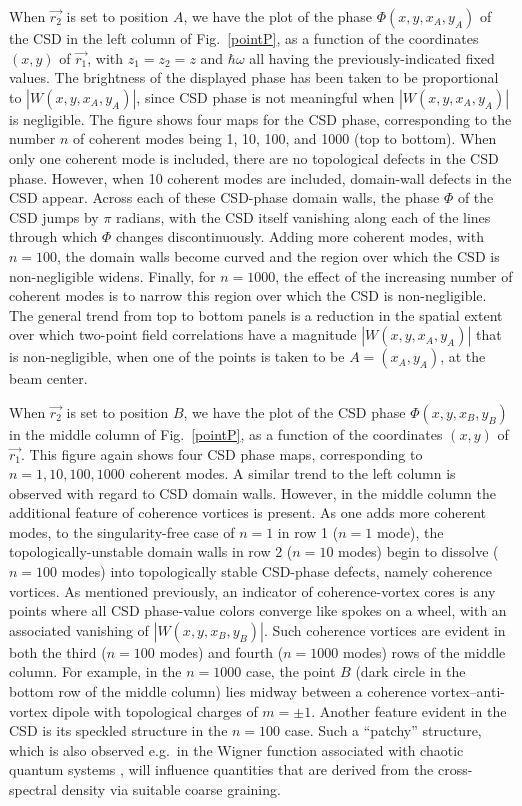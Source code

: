 \documentclass[%
 reprint,
 amsmath,amssymb,
 aps,
]{revtex4-1}
\begin{document}
When $\vec{r_2}$ is set to position $A$, we have the plot of the phase $\Phi(x,y,x_A,y_A)$ of the CSD in the left column of Fig.~\ref{pointP}, as a function of the coordinates $(x,y)$ of $\vec{r_1}$, with $z_1=z_2=z$ and $\hbar\omega$ all having the previously-indicated fixed values.  The brightness of the displayed phase has been taken to be proportional to $|W(x,y,x_A,y_A)|$, since CSD phase is not meaningful when $|W(x,y,x_A,y_A)|$ is negligible.  The figure shows four maps for the CSD phase, corresponding to the number $n$ of coherent modes being 1, 10, 100, and 1000 (top to bottom).  When only one coherent mode is included, there are no topological defects in the CSD phase.  However, when 10 coherent modes are included, domain-wall defects in the CSD appear.  Across each of these CSD-phase domain walls, the phase $\Phi$ of the CSD jumps by $\pi$ radians, with the CSD itself vanishing along each of the lines through which $\Phi$ changes discontinuously.  Adding more coherent modes, with $n=100$, the domain walls become curved and the region over which the CSD is non-negligible widens.  Finally, for $n=1000$, the effect of the increasing number of coherent modes is to narrow this region over which the CSD is non-negligible.  The general trend from top to bottom panels is a reduction in the spatial extent over which two-point field correlations have a magnitude $|W(x,y,x_A,y_A)|$ that is non-negligible, when one of the points is taken to be $A=(x_A,y_A)$, at the beam center.      

When $\vec{r_2}$ is set to position $B$, we have the plot of the CSD phase $\Phi(x,y,x_B,y_B)$ in the middle column of Fig.~\ref{pointP}, as a function of the coordinates $(x,y)$ of $\vec{r_1}$.  This figure again shows four CSD phase maps, corresponding to $n=1,10,100,1000$ coherent modes.  A similar trend to the left column is observed with regard to CSD domain walls.  However, in the middle column the additional feature of coherence vortices is present.  As one adds more coherent modes, to the singularity-free case of $n=1$ in row 1 ($n=1$ mode), the topologically-unstable domain walls in row 2 ($n=10$ modes) begin to dissolve ($n=100$ modes) into  topologically stable CSD-phase defects, namely coherence vortices. As mentioned previously, an indicator of coherence-vortex cores is any points where all CSD phase-value colors converge like spokes on a wheel, with an associated vanishing of $|W(x,y,x_B,y_B)|$.  Such coherence vortices are evident in both the third ($n=100$ modes) and fourth ($n=1000$ modes) rows of the middle column.  For example, in the $n=1000$ case, the point $B$ (dark circle in the bottom row of the middle column) lies midway between a coherence vortex--anti-vortex dipole with topological charges of $m = \pm 1$. Another feature evident in the CSD is its speckled  structure in the $n=100$ case.  Such a ``patchy'' structure, which is also observed e.g.~in the Wigner function associated with chaotic quantum systems \cite{Zurek}, will influence quantities that are derived from the cross-spectral density via suitable coarse graining.
\end{document}
